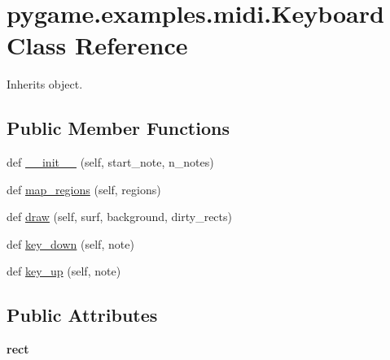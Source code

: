\hypertarget{classpygame_1_1examples_1_1midi_1_1_keyboard}{}\section{pygame.\+examples.\+midi.\+Keyboard Class Reference}
\label{classpygame_1_1examples_1_1midi_1_1_keyboard}


Inherits object.

\subsection*{Public Member Functions}
\begin{DoxyCompactItemize}
\item 
def \hyperlink{classpygame_1_1examples_1_1midi_1_1_keyboard_affb74278a62353871f8ff7d152883c77}{\+\_\+\+\_\+init\+\_\+\+\_\+} (self, start\+\_\+note, n\+\_\+notes)
\item 
def \hyperlink{classpygame_1_1examples_1_1midi_1_1_keyboard_a6028f8e68376b4345c7ab2d6d312b086}{map\+\_\+regions} (self, regions)
\item 
def \hyperlink{classpygame_1_1examples_1_1midi_1_1_keyboard_af9b304df79bd4360b1b78188b3958dcd}{draw} (self, surf, background, dirty\+\_\+rects)
\item 
def \hyperlink{classpygame_1_1examples_1_1midi_1_1_keyboard_a218c75e0ee10e3ec7554fbf82de06bec}{key\+\_\+down} (self, note)
\item 
def \hyperlink{classpygame_1_1examples_1_1midi_1_1_keyboard_a53d2e7259698cecaef8ed1488f377432}{key\+\_\+up} (self, note)
\end{DoxyCompactItemize}
\subsection*{Public Attributes}
\begin{DoxyCompactItemize}
\item 
\mbox{\label{classpygame_1_1examples_1_1midi_1_1_keyboard_a1a1aa41ca6874c9534c5891146f5dd5b}} 
{\bfseries rect}
\end{DoxyCompactItemize}
